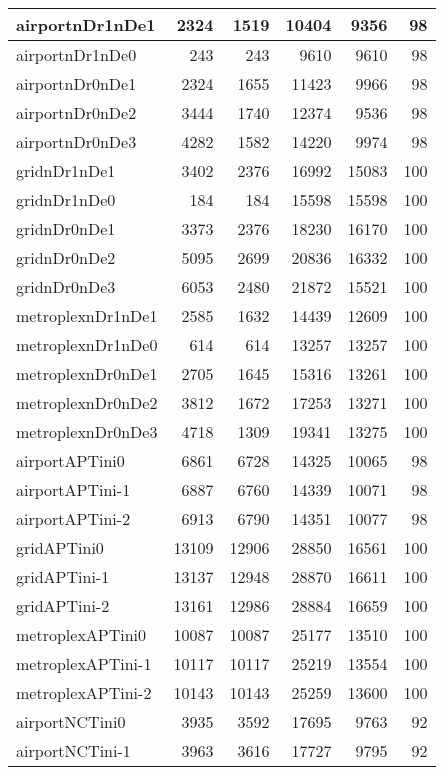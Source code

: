 \begin{longtable}{|l|r|r|r|r|r|}
\endlastfoot
airportnDr1nDe1 & 2324 & 1519 & 10404 & 9356 & 98 \\ \hline
airportnDr1nDe0 & 243 & 243 & 9610 & 9610 & 98 \\ \hline
airportnDr0nDe1 & 2324 & 1655 & 11423 & 9966 & 98 \\ \hline
airportnDr0nDe2 & 3444 & 1740 & 12374 & 9536 & 98 \\ \hline
airportnDr0nDe3 & 4282 & 1582 & 14220 & 9974 & 98 \\ \hline
gridnDr1nDe1 & 3402 & 2376 & 16992 & 15083 & 100 \\ \hline
gridnDr1nDe0 & 184 & 184 & 15598 & 15598 & 100 \\ \hline
gridnDr0nDe1 & 3373 & 2376 & 18230 & 16170 & 100 \\ \hline
gridnDr0nDe2 & 5095 & 2699 & 20836 & 16332 & 100 \\ \hline
gridnDr0nDe3 & 6053 & 2480 & 21872 & 15521 & 100 \\ \hline
metroplexnDr1nDe1 & 2585 & 1632 & 14439 & 12609 & 100 \\ \hline
metroplexnDr1nDe0 & 614 & 614 & 13257 & 13257 & 100 \\ \hline
metroplexnDr0nDe1 & 2705 & 1645 & 15316 & 13261 & 100 \\ \hline
metroplexnDr0nDe2 & 3812 & 1672 & 17253 & 13271 & 100 \\ \hline
metroplexnDr0nDe3 & 4718 & 1309 & 19341 & 13275 & 100 \\ \hline
airportAPTini0 & 6861 & 6728 & 14325 & 10065 & 98 \\ \hline
airportAPTini-1 & 6887 & 6760 & 14339 & 10071 & 98 \\ \hline
airportAPTini-2 & 6913 & 6790 & 14351 & 10077 & 98 \\ \hline
gridAPTini0 & 13109 & 12906 & 28850 & 16561 & 100 \\ \hline
gridAPTini-1 & 13137 & 12948 & 28870 & 16611 & 100 \\ \hline
gridAPTini-2 & 13161 & 12986 & 28884 & 16659 & 100 \\ \hline
metroplexAPTini0 & 10087 & 10087 & 25177 & 13510 & 100 \\ \hline
metroplexAPTini-1 & 10117 & 10117 & 25219 & 13554 & 100 \\ \hline
metroplexAPTini-2 & 10143 & 10143 & 25259 & 13600 & 100 \\ \hline
airportNCTini0 & 3935 & 3592 & 17695 & 9763 & 92 \\ \hline
airportNCTini-1 & 3963 & 3616 & 17727 & 9795 & 92 \\ \hline

\end{longtable}
